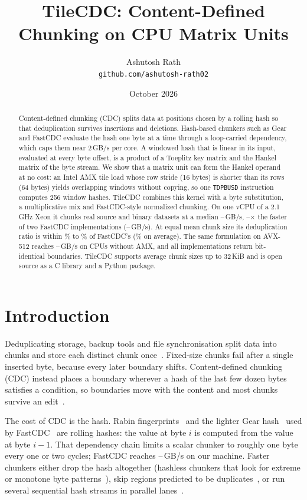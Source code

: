 \documentclass[10pt,twocolumn]{article}
\title{\textbf{TileCDC: Content-Defined Chunking on CPU Matrix Units}}
\author{Ashutosh Rath\\{\small\texttt{github.com/ashutosh-rath02}}}
\date{October 2026}
\begin{document}
\maketitle

\begin{abstract}
Content-defined chunking (CDC) splits data at positions chosen by a rolling hash so that deduplication survives insertions and deletions. Hash-based chunkers such as Gear and FastCDC evaluate the hash one byte at a time through a loop-carried dependency, which caps them near 2\,GB/s per core. A windowed hash that is linear in its input, evaluated at every byte offset, is a product of a Toeplitz key matrix and the Hankel matrix of the byte stream. We show that a matrix unit can form the Hankel operand at no cost: an Intel AMX tile load whose row stride (16 bytes) is shorter than its rows (64 bytes) yields overlapping windows without copying, so one \texttt{TDPBUSD} instruction computes 256 window hashes. TileCDC combines this kernel with a byte substitution, a multiplicative mix and FastCDC-style normalized chunking. On one vCPU of a 2.1\,GHz Xeon it chunks real source and binary datasets at a median \amxMin--\amxMax\,GB/s, \spMin--\spMax$\times$ the faster of two FastCDC implementations (\fcMin--\fcMax\,GB/s). At equal mean chunk size its deduplication ratio is within \dedupDiffMin\% to \dedupDiffMax\% of FastCDC's (\dedupDiffMean\% on average). The same formulation on AVX-512 reaches \avxMin--\avxMax\,GB/s on CPUs without AMX, and all implementations return bit-identical boundaries. TileCDC supports average chunk sizes up to 32\,KiB and is open source as a C library and a Python package.
\end{abstract}

\section{Introduction}
Deduplicating storage, backup tools and file synchronisation split data into chunks and store each distinct chunk once~\cite{lbfs,fastcdc16}. Fixed-size chunks fail after a single inserted byte, because every later boundary shifts. Content-defined chunking (CDC) instead places a boundary wherever a hash of the last few dozen bytes satisfies a condition, so boundaries move with the content and most chunks survive an edit~\cite{rabin,lbfs}.

The cost of CDC is the hash. Rabin fingerprints~\cite{rabin} and the lighter Gear hash~\cite{ddelta} used by FastCDC~\cite{fastcdc16,fastcdc20} are rolling hashes: the value at byte $i$ is computed from the value at byte $i-1$. That dependency chain limits a scalar chunker to roughly one byte every one or two cycles; FastCDC reaches \fcMin--\fcMax\,GB/s on our machine. Faster chunkers either drop the hash altogether (hashless chunkers that look for extreme or monotone byte patterns~\cite{ae,seqcdc,vectorcdc}), skip regions predicted to be duplicates~\cite{rapidcdc}, or run several sequential hash streams in parallel lanes~\cite{sscdc,vectorcdc}.
\end{document}
